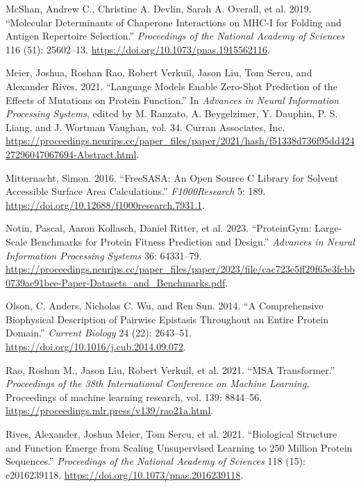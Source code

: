 \documentclass[
  11pt,
  us-letterpaper,
  DIV=11,
  numbers=noendperiod]{scrartcl}
\newlength{\cslhangindent}
\newenvironment{CSLReferences}[2] %
 {\begin{list}{}{%
  \setlength{\itemindent}{0pt}
  \setlength{\leftmargin}{0pt}
  \setlength{\parsep}{0pt}
  \ifodd #1
   \setlength{\leftmargin}{\cslhangindent}
   \setlength{\itemindent}{-1\cslhangindent}
  \fi
  \setlength{\itemsep}{#2\baselineskip}}}
 {\end{list}}
\begin{document}
\begin{CSLReferences}{1}{1}
McShan, Andrew C., Christine A. Devlin, Sarah A. Overall, et al. 2019.
{``Molecular Determinants of Chaperone Interactions on {MHC-I} for
Folding and Antigen Repertoire Selection.''} \emph{Proceedings of the
National Academy of Sciences} 116 (51): 25602--13.
\url{https://doi.org/10.1073/pnas.1915562116}.

Meier, Joshua, Roshan Rao, Robert Verkuil, Jason Liu, Tom Sercu, and
Alexander Rives. 2021. {``Language Models Enable Zero-Shot Prediction of
the Effects of Mutations on Protein Function.''} In \emph{Advances in
Neural Information Processing Systems}, edited by M. Ranzato, A.
Beygelzimer, Y. Dauphin, P. S. Liang, and J. Wortman Vaughan, vol. 34.
Curran Associates, Inc.
\url{https://proceedings.neurips.cc/paper_files/paper/2021/hash/f51338d736f95dd42427296047067694-Abstract.html}.

Mitternacht, Simon. 2016. {``{FreeSASA}: An Open Source {C} Library for
Solvent Accessible Surface Area Calculations.''} \emph{F1000Research} 5:
189. \url{https://doi.org/10.12688/f1000research.7931.1}.

Notin, Pascal, Aaron Kollasch, Daniel Ritter, et al. 2023.
{``{ProteinGym}: Large-Scale Benchmarks for Protein Fitness Prediction
and Design.''} \emph{Advances in Neural Information Processing Systems}
36: 64331--79.
\url{https://proceedings.neurips.cc/paper_files/paper/2023/file/cac723e5ff29f65e3fcbb0739ae91bee-Paper-Datasets_and_Benchmarks.pdf}.

Olson, C. Anders, Nicholas C. Wu, and Ren Sun. 2014. {``A Comprehensive
Biophysical Description of Pairwise Epistasis Throughout an Entire
Protein Domain.''} \emph{Current Biology} 24 (22): 2643--51.
\url{https://doi.org/10.1016/j.cub.2014.09.072}.

Rao, Roshan M., Jason Liu, Robert Verkuil, et al. 2021. {``{MSA}
Transformer.''} \emph{Proceedings of the 38th International Conference
on Machine Learning}, Proceedings of machine learning research, vol.
139: 8844--56. \url{https://proceedings.mlr.press/v139/rao21a.html}.

Rives, Alexander, Joshua Meier, Tom Sercu, et al. 2021. {``Biological
Structure and Function Emerge from Scaling Unsupervised Learning to 250
Million Protein Sequences.''} \emph{Proceedings of the National Academy
of Sciences} 118 (15): e2016239118.
\url{https://doi.org/10.1073/pnas.2016239118}.


\end{CSLReferences}
\end{document}
